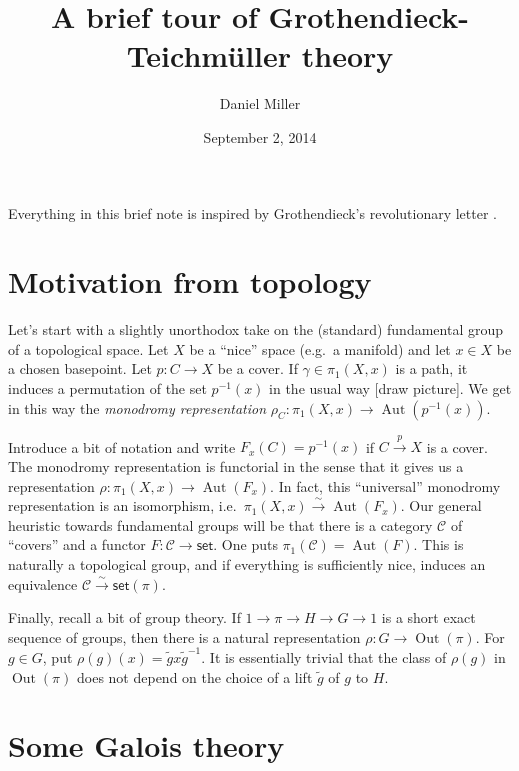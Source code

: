 \documentclass{article}
\title{A brief tour of Grothendieck-Teichm\"uller theory}
\author{Daniel Miller}
\date{September 2, 2014}
\DeclareMathOperator{\aut}{Aut}
\DeclareMathOperator{\out}{Out}
\newcommand{\cC}{\mathcal{C}}
\newcommand{\iso}{\xrightarrow\sim}
\newcommand{\sets}{\mathsf{set}}
\begin{document}
\maketitle





Everything in this brief note is inspired by Grothendieck's revolutionary 
letter \cite{grothendieck-1997}. 





\section{Motivation from topology}


Let's start with a slightly unorthodox take on the (standard) fundamental group 
of a topological space. Let $X$ be a ``nice'' space (e.g.~a manifold) and let 
$x\in X$ be a chosen basepoint. Let $p:C\to X$ be a cover. If 
$\gamma\in \pi_1(X,x)$ is a path, it induces a permutation of the set
$p^{-1}(x)$ in the usual way [draw picture]. We get in this way the 
\emph{monodromy representation} $\rho_C:\pi_1(X,x) \to \aut(p^{-1}(x))$. 

Introduce a bit of notation and write $F_x(C)=p^{-1}(x)$ if $C\xrightarrow p X$ 
is a cover. The monodromy representation is functorial in the sense that it 
gives us a representation $\rho:\pi_1(X,x)\to \aut(F_x)$. In fact, this 
``universal'' monodromy representation is an isomorphism, 
i.e.~$\pi_1(X,x)\iso\aut(F_x)$. Our general heuristic towards fundamental 
groups will be that there is a category $\cC$ of ``covers'' and a functor 
$F:\cC\to \sets$. One puts $\pi_1(\cC)=\aut(F)$. This is naturally a 
topological group, and if everything is sufficiently nice, induces an 
equivalence $\cC\iso \sets(\pi)$. 

Finally, recall a bit of group theory. If $1\to \pi\to H\to G\to 1$ is a short 
exact sequence of groups, then there is a natural representation 
$\rho:G\to \out(\pi)$. For $g\in G$, put 
$\rho(g)(x) = \widetilde{g} x \widetilde{g}^{-1}$. It is essentially trivial 
that the class of $\rho(g)$ in $\out(\pi)$ does not depend on the choice of a 
lift $\widetilde g$ of $g$ to $H$. 





\section{Some Galois theory}
\end{document}
